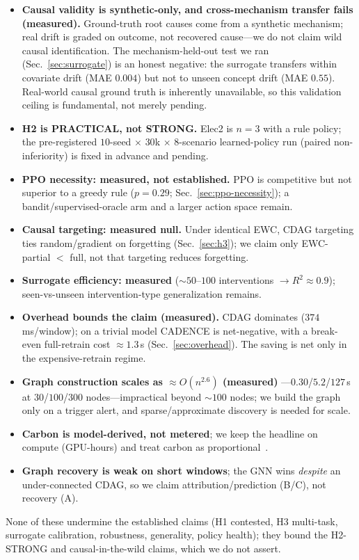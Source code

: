 \documentclass[conference]{IEEEtran}
\begin{document}
\begin{itemize}
\item \textbf{Causal validity is synthetic-only, and cross-mechanism
transfer fails (measured).} Ground-truth root causes come from a synthetic
mechanism; real drift is graded on outcome, not recovered cause---we do not
claim wild causal identification. The mechanism-held-out test we ran
(Sec.~\ref{sec:surrogate}) is an honest negative: the surrogate transfers
within covariate drift (MAE $0.004$) but not to unseen concept drift
(MAE $0.55$). Real-world causal ground truth is inherently unavailable, so
this validation ceiling is fundamental, not merely pending.
\item \textbf{H2 is PRACTICAL, not STRONG.} Elec2 is $n{=}3$ with a rule
policy; the pre-registered $10$-seed $\times$ $30$k $\times$ $8$-scenario
learned-policy run (paired non-inferiority) is fixed in advance and pending.
\item \textbf{PPO necessity: measured, not established.} PPO is competitive
but not superior to a greedy rule ($p=0.29$; Sec.~\ref{sec:ppo-necessity});
a bandit/supervised-oracle arm and a larger action space remain.
\item \textbf{Causal targeting: measured null.} Under identical EWC, CDAG
targeting ties random/gradient on forgetting (Sec.~\ref{sec:h3}); we claim
only EWC-partial $<$ full, not that targeting reduces forgetting.
\item \textbf{Surrogate efficiency: measured} ($\sim\!50$--$100$
interventions $\to R^2\!\approx\!0.9$); seen-vs-unseen intervention-type
generalization remains.
\item \textbf{Overhead bounds the claim (measured).} CDAG dominates
($374$\,ms/window); on a trivial model CADENCE is net-negative, with a
break-even full-retrain cost $\approx1.3$\,s (Sec.~\ref{sec:overhead}). The
saving is net only in the expensive-retrain regime.
\item \textbf{Graph construction scales as $\approx O(n^{2.6})$ (measured)}
---$0.30$/$5.2$/$127$\,s at $30$/$100$/$300$ nodes---impractical beyond
$\sim\!100$ nodes; we build the graph only on a trigger alert, and
sparse/approximate discovery is needed for scale.
\item \textbf{Carbon is model-derived, not metered}; we keep the headline on
compute (GPU-hours) and treat carbon as
proportional~\cite{lacoste2019quantifying,patterson2021carbon}.
\item \textbf{Graph recovery is weak on short windows}; the GNN wins
\emph{despite} an under-connected CDAG, so we claim attribution/prediction
(B/C), not recovery (A).
\end{itemize}
None of these undermine the established claims (H1 contested, H3 multi-task,
surrogate calibration, robustness, generality, policy health); they bound
the H2-STRONG and causal-in-the-wild claims, which we do not assert.
\end{document}
